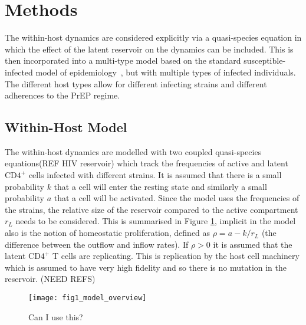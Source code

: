\documentclass[DIV=15]{scrartcl}
\begin{document}
\section{Methods}
The within-host dynamics are considered explicitly via a   quasi-species equation in which the effect of the latent reservoir on the dynamics can be included.  This is then incorporated into a multi-type model based on the standard susceptible-infected  model of epidemiology~\cite{diekmann2013}, but with multiple types of infected individuals. The different host types allow for different infecting strains and different adherences to the PrEP regime.


\subsection{Within-Host Model}



The within-host dynamics are modelled with two coupled quasi-species equations(REF HIV reservoir) which  track the frequencies of active and latent CD$4^+$ cells infected with different strains. It is assumed that there is a small probability $k$ that  a cell will enter the resting state and similarly a small probability $a$  that a cell will  be activated. Since the model uses the frequencies of the strains, the relative size of the reservoir compared to the active compartment $r_L$ needs to be considered. This is summarised in Figure \ref{Within Host Diagram}, implicit in the model also is  the notion of homeostatic proliferation, defined as $\rho = a - k/r_L$ (the difference between the outflow and inflow rates). If $\rho>0$
 it is assumed that
the latent CD$4^+$ T cells  are replicating. This is replication by the host cell machinery which is assumed  to have very high fidelity and so there is no mutation in the reservoir. (NEED REFS)
\begin{figure}[h]
 \begin{center}
 \texttt{[image: fig1\_model\_overview]}
 \end{center}
 \caption{Can I use this?}
 \label{Within Host Diagram}
 \end{figure}
 
\end{document}
